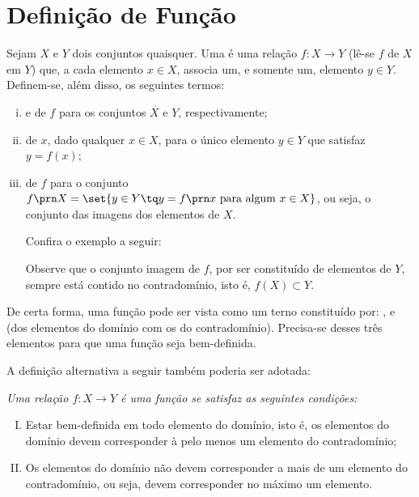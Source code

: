 \section{Definição de Função}

\begin{definition}
Sejam $X$ e $Y$ dois conjuntos quaisquer.
Uma  é uma relação $f: X \to Y$ (lê-se $f$ de $X$ em $Y$) que, a cada elemento $x \in X$, associa um, e somente um, elemento $y \in Y$.
Definem-se, além disso, os seguintes termos:
%
\begin{enumerate}[(i)]
\item {} e  de $f$ para os conjuntos $X$ e $Y$, respectivamente;
\item {} de $x$, dado qualquer $x \in X$, para o único elemento $y \in Y$ que satisfaz $y = f(x)$;
\item {} de $f$ para o conjunto $f\prn X = \set{y \in Y \tq y = f \prn x \text{ para algum } x \in X }$, ou seja, o conjunto das imagens dos elementos de $X$.

Confira o exemplo a seguir:
\begin{center}
\end{center}
Observe que o conjunto imagem de $f$, por ser constituído de elementos de $Y$, sempre está contido no contradomínio, isto é, $f(X) \subset Y$.
\end{enumerate}
\end{definition}

De certa forma, uma função pode ser vista como um terno constituído por: ,  e  (dos elementos do domínio com os do contradomínio). 
Precisa-se desses três elementos para que uma função seja bem-definida. 

A definição alternativa a seguir também poderia ser adotada:
{\it \label{def:funcao-alternativa} Uma relação $f: X \to Y$ é uma \emph {função} se satisfaz as seguintes condições:
%
\begin{enumerate}[(I)]
  \item Estar bem-definida em todo elemento do domínio, isto é, os elementos do domínio devem corresponder à pelo menos um elemento do contradomínio;
  \item Os elementos do domínio não devem corresponder a mais de um elemento do contradomínio, ou seja, devem corresponder no máximo um elemento.
\end{enumerate}}


